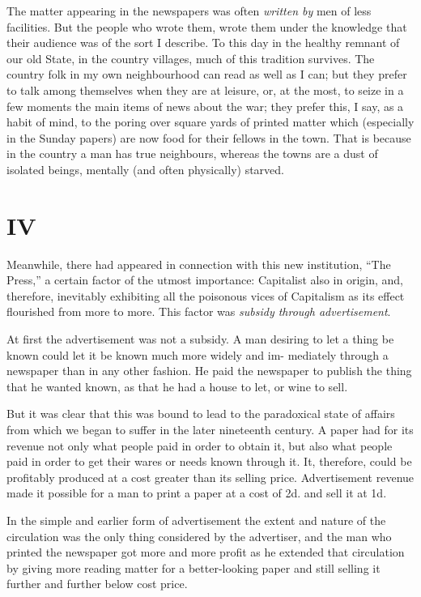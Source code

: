 \documentclass{book}
\begin{document}
The matter appearing in the newspapers was often \emph{written by} men of less facilities. But the people who wrote them, wrote them under the knowledge that their audience was of the sort I describe. To this day in the healthy remnant of our old State, in the country villages, much of this tradition survives. The country folk in my own neighbourhood can read as well as I can; but they prefer to talk among themselves when they are at leisure, or, at the most, to seize in a few moments the main items of news about the war; they prefer this, I say, as a habit of mind, to the poring over square yards of printed matter which (especially in the Sunday papers) are now food for their fellows in the town. That is because in the country a man has true neighbours, whereas the towns are a dust of isolated beings, mentally (and often physically) starved.

\chapter*{IV}
\label{chapter-5}
Meanwhile, there had appeared in connection with this new institution, “The Press,” a certain factor of the utmost importance: Capitalist also in origin, and, therefore, inevitably exhibiting all the poisonous vices of Capitalism as its effect flourished from more to more. This factor was \emph{subsidy through advertisement}.

At first the advertisement was not a subsidy. A man desiring to let a thing be known could let it be known much more widely and im- mediately through a newspaper than in any other fashion. He paid the newspaper to publish the thing that he wanted known, as that he had a house to let, or wine to sell.

But it was clear that this was bound to lead to the paradoxical state of affairs from which we began to suffer in the later nineteenth century. A paper had for its revenue not only what people paid in order to obtain it, but also what people paid in order to get their wares or needs known through it. It, therefore, could be profitably produced at a cost greater than its selling price. Advertisement revenue made it possible for a man to print a paper at a cost of 2d. and sell it at 1d.

In the simple and earlier form of advertisement the extent and nature of the circulation was the only thing considered by the advertiser, and the man who printed the newspaper got more and more profit as he extended that circulation by giving more reading matter for a better-looking paper and still selling it further and further below cost price.
\end{document}
